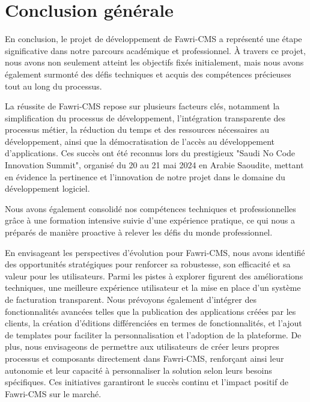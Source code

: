 \chapter*{Conclusion générale}




\label{chap:General Conclusion} 

\hspace{\parindent}En conclusion, le projet de développement de Fawri-CMS a représenté une étape significative dans notre parcours académique et professionnel. À travers ce projet, nous avons non seulement atteint les objectifs fixés initialement, mais nous avons également surmonté des défis techniques et acquis des compétences précieuses tout au long du processus.

La réussite de Fawri-CMS repose sur plusieurs facteurs clés, notamment la simplification du processus de développement, l'intégration transparente des processus métier, la réduction du temps et des ressources nécessaires au développement, ainsi que la démocratisation de l'accès au développement d'applications. Ces succès ont été reconnus lors du prestigieux "Saudi No Code Innovation Summit", organisé du 20 au 21 mai 2024 en Arabie Saoudite, mettant en évidence la pertinence et l'innovation de notre projet dans le domaine du développement logiciel.

Nous avons également consolidé nos compétences techniques et professionnelles grâce à une formation intensive suivie d'une expérience pratique, ce qui nous a préparés de manière proactive à relever les défis du monde professionnel.

En envisageant les perspectives d'évolution pour Fawri-CMS, nous avons identifié des opportunités stratégiques pour renforcer sa robustesse, son efficacité et sa valeur pour les utilisateurs. Parmi les pistes à explorer figurent des améliorations techniques, une meilleure expérience utilisateur et la mise en place d'un système de facturation transparent. Nous prévoyons également d'intégrer des fonctionnalités avancées telles que la publication des applications créées par les clients, la création d'éditions différenciées en termes de fonctionnalités, et l'ajout de templates pour faciliter la personnalisation et l'adoption de la plateforme. De plus, nous envisageons de permettre aux utilisateurs de créer leurs propres processus et composants directement dans Fawri-CMS, renforçant ainsi leur autonomie et leur capacité à personnaliser la solution selon leurs besoins spécifiques. Ces initiatives garantiront le succès continu et l'impact positif de Fawri-CMS sur le marché.

